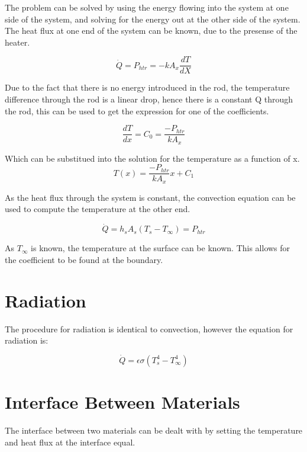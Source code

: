 \documentclass[•]{article}
\begin{document}
The problem can be solved by using the energy flowing into the system at one side of the system, and solving for the energy out at the other side of the system. The heat flux at one end of the system can be known, due to the presense of the heater.

\begin{equation}
\dot{Q} = P_{htr} = -kA_x\frac{dT}{dX}
\end{equation}

Due to the fact that there is no energy introduced in the rod, the temperature difference through the rod is a linear drop, hence there is a constant Q through the rod, this can be used to get the expression for one of the coefficients.

\begin{equation}
\frac{dT}{dx} = C_0 = \frac{-P_{htr}}{kA_x}
\end{equation}

Which can be substitued into the solution for the temperature as a function of x.
\begin{equation}
T(x) = \frac{-P_{htr}}{kA_x}x + C_1
\end{equation}

As the heat flux through the system is constant, the convection equation can be used to compute the temperature at the other end.

\begin{equation}
\dot{Q} = h_sA_s(T_s - T_{\infty}) = P_{htr}
\end{equation}

As $T_{\infty}$ is known, the temperature at the surface can be known. This allows for the coefficient to be found at the boundary.

\section*{Radiation}
The procedure for radiation is identical to convection, however the equation for radiation is:

\begin{equation}
\dot{Q} = \epsilon\sigma(T_s^4 - T_{\infty}^4)
\end{equation}

\section*{Interface Between Materials}
The interface between two materials can be dealt with by setting the temperature and heat flux at the interface equal.
\end{document}
